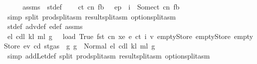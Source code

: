 \begin{isabellebody}
\ \ \isamarkupfalse%
\ \isamarkupfalse%
\ assms\ {}\ st{}{\isacharunderscore}{\kern0pt}def\ {}\ {}\ \isamarkupfalse%
\ ct\ cn\ fb\ \ {}{\isacharcolon}{\kern0pt}\ {\isachardoublequoteopen}ep\ {\isachardollar}{\kern0pt}{\isachardollar}{\kern0pt}\ i\ {\isacharequal}{\kern0pt}\ Some{\isacharparenleft}{\kern0pt}ct{\isacharcomma}{\kern0pt}\ cn{\isacharcomma}{\kern0pt}\ fb{\isacharparenright}{\kern0pt}{\isachardoublequoteclose}\ \isamarkupfalse%
\ {\isacharparenleft}{\kern0pt}simp\ split{\isacharcolon}{\kern0pt}\ prod{\isachardot}{\kern0pt}split{\isacharunderscore}{\kern0pt}asm\ result{\isachardot}{\kern0pt}split{\isacharunderscore}{\kern0pt}asm\ option{\isachardot}{\kern0pt}split{\isacharunderscore}{\kern0pt}asm{\isacharparenright}{\kern0pt}\isanewline
\ \ \isamarkupfalse%
\ \isamarkupfalse%
\ st{}{\isacharunderscore}{\kern0pt}def\ adv{}{\isacharunderscore}{\kern0pt}def\ e{\isacharprime}{\kern0pt}{\isacharunderscore}{\kern0pt}def\ assms\ {}\ {}\ {}\ {}\ \isamarkupfalse%
\ e\isactrlsub l\ cd\isactrlsub l\ k\isactrlsub l\ m\isactrlsub l\ g{\isacharprime}{\kern0pt}\ \ {}{\isacharcolon}{\kern0pt}\ {\isachardoublequoteopen}load\ True\ {\isacharparenleft}{\kern0pt}fst\ cn{\isacharparenright}{\kern0pt}\ xe\ {\isacharparenleft}{\kern0pt}e{\isacharprime}{\kern0pt}\ ct\ i\ v{\isacharparenright}{\kern0pt}\ emptyStore\ emptyStore\ emptyStore\ ev\ cd\ {\isacharparenleft}{\kern0pt}st{}{\isasymlparr}gas\ {\isacharcolon}{\kern0pt}{\isacharequal}{\kern0pt}\ g{\isasymrparr}{\isacharparenright}{\kern0pt}\ g\ {\isacharequal}{\kern0pt}\ Normal\ {\isacharparenleft}{\kern0pt}{\isacharparenleft}{\kern0pt}e\isactrlsub l{\isacharcomma}{\kern0pt}\ cd\isactrlsub l{\isacharcomma}{\kern0pt}\ k\isactrlsub l{\isacharcomma}{\kern0pt}\ m\isactrlsub l{\isacharparenright}{\kern0pt}{\isacharcomma}{\kern0pt}\ g{\isacharprime}{\kern0pt}{\isacharparenright}{\kern0pt}{\isachardoublequoteclose}\ \isamarkupfalse%
\ {\isacharparenleft}{\kern0pt}simp\ add{\isacharcolon}{\kern0pt}Let{\isacharunderscore}{\kern0pt}def\ split{\isacharcolon}{\kern0pt}\ prod{\isachardot}{\kern0pt}split{\isacharunderscore}{\kern0pt}asm\ result{\isachardot}{\kern0pt}split{\isacharunderscore}{\kern0pt}asm\ option{\isachardot}{\kern0pt}split{\isacharunderscore}{\kern0pt}asm{\isacharparenright}{\kern0pt}\isanewline

\end{isabellebody}
